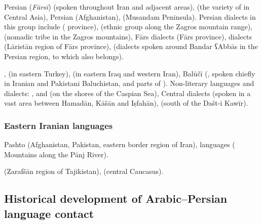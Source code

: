 \documentclass[output=paper]{langsci/langscibook}
\begin{document}
Persian (\textit{Fārsī}) (spoken throughout Iran and adjacent areas),  (the variety of  in Central Asia),  Persian (Afghanistan),  (Musandam Peninsula). Persian dialects in this group include  ( province),  (ethnic group along the Zagros mountain range),  (nomadic tribe in the Zagros mountains), Fārs dialects (Fārs province),  dialects (Lāristān region of Fārs province),  (dialects spoken around Bandar ʕAbbās in the Persian  region, to which  also belongs).



,  (in eastern Turkey),  (in eastern Iraq and western Iran), Balūčī (, spoken chiefly in Iranian and Pakistani Baluchistan, and parts of ). Non-literary languages and dialects: ,  and  (on the shores of the Caspian Sea), Central dialects (spoken in a vast area between Hamadān, Kāšān and Iṣfahān),  (south of the Dašt-i Kawīr).



\subsubsection{Eastern Iranian languages}

Pashto (Afghanistan, Pakistan, eastern border region of Iran),  languages ( Mountains along the Pānj River).

 (Zarafšān region of Tajikistan),  (central Caucasus).

\subsection{Historical development of Arabic–Persian language contact} %
\end{document}

